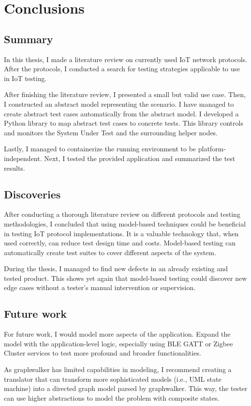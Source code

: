 \chapter{Conclusions}
\label{chap:conclusion}
\section{Summary}
\label{sec:conc:summ}
In this thesis, I made a literature review on currently used IoT network protocols. After the protocols, I conducted a search for testing strategies applicable to use in IoT testing. 

After finishing the literature review, I presented a small but valid use case. Then, I constructed an abstract model representing the scenario. I have managed to create abstract test cases automatically from the abstract model. I developed a Python library to map abstract test cases to concrete tests. This library controls and monitors the System Under Test and the surrounding helper nodes.

Lastly, I managed to containerize the running environment to be platform-independent. Next, I tested the provided application and summarized the test results.

\section{Discoveries}
\label{sec:conc:disc}
After conducting a thorough literature review on different protocols and testing methodologies, I concluded that using model-based techniques could be beneficial in testing IoT protocol implementations. It is a valuable technology that, when used correctly, can reduce test design time and costs. Model-based testing can automatically create test suites to cover different aspects of the system. 

During the thesis, I managed to find new defects in an already existing and tested product. This shows yet again that model-based testing could discover new edge cases without a tester's manual intervention or supervision.

\section{Future work}
\label{sec:conc:future}
For future work, I would model more aspects of the application. Expand the model with the application-level logic, especially using BLE GATT or Zigbee Cluster services to test more profound and broader functionalities.

As graphwalker has limited capabilities in modeling, I recommend creating a translator that can transform more sophisticated models (i.e., UML state machine) into a directed graph model parsed by graphwalker. This way, the tester can use higher abstractions to model the problem with composite states.